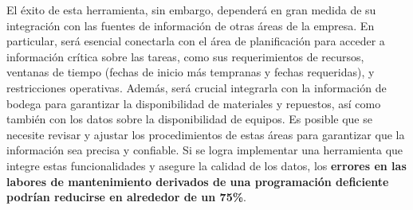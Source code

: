 \documentclass{article}
\begin{document}
\begin{appendix}
    El éxito de esta herramienta, sin embargo, dependerá en gran medida de su integración con las fuentes de información de otras áreas de la empresa. En particular, será esencial conectarla con el área de planificación para acceder a información crítica sobre las tareas, como sus requerimientos de recursos, ventanas de tiempo (fechas de inicio más tempranas y fechas requeridas), y restricciones operativas. Además, será crucial integrarla con la información de bodega para garantizar la disponibilidad de materiales y repuestos, así como también con los datos sobre la disponibilidad de equipos. Es posible que se necesite revisar y ajustar los procedimientos de estas áreas para garantizar que la información sea precisa y confiable. Si se logra implementar una herramienta que integre estas funcionalidades y asegure la calidad de los datos, los \textbf{errores en las labores de mantenimiento derivados de una programación deficiente podrían reducirse en alrededor de un 75\%}.
    
    
\end{appendix}

\printbibliography
\end{document}
